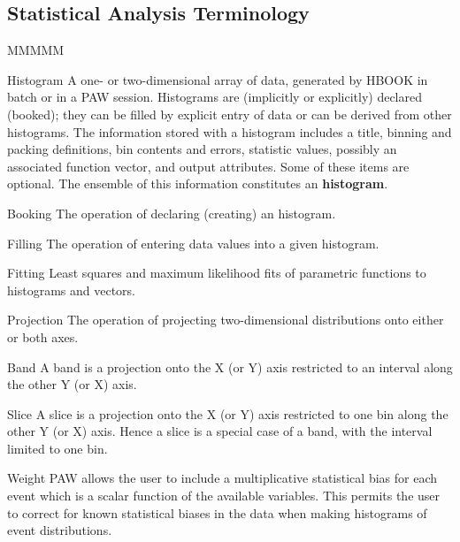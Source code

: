 \subsection*{Statistical Analysis Terminology}

\begin{DL}{MMMMM}
\item[Histogram] A one- or two-dimensional array of data, generated
                 by HBOOK in batch or in a PAW session. Histograms are (implicitly or
                 explicitly) declared (booked);
                 they can be filled by explicit entry of data
                 or can be derived from other histograms. The information stored
                 with a histogram includes a title, binning and packing definitions,
                 bin contents and errors, statistic values, possibly an
                 associated function vector, and output attributes.
                 Some of these items are optional.
                 The ensemble of this information constitutes an {\bf histogram}.
\item[Booking]   The operation of declaring (creating) an histogram.
\item[Filling]   The operation of entering data values into a given histogram.
\item[Fitting]   Least squares and maximum likelihood fits of
                 parametric functions to histograms and vectors.
\item[Projection]The operation of projecting two-dimensional
                 distributions onto either or both axes.
\item[Band]      A band is a projection onto the X (or Y) axis
                 restricted to an interval
                 along the other Y (or X) axis.
\item[Slice]     A slice is a projection onto the X (or Y) 
                 axis restricted to one bin
                 along the other Y (or X) axis.
                 Hence a slice is a special case of a band, with
                 the interval limited to one bin.
\item[Weight]    PAW allows the user to include a
                 multiplicative statistical bias for each event which is a scalar
                 function of the available variables.  This permits the user to
                 correct for known statistical biases in the data when making
                 histograms of event distributions.
\end{DL}

